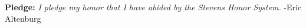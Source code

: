 \documentclass[11pt]{article}
\begin{document}
\raggedright
\newcommand\NAME{Eric Altenburg}  %
\newcommand\COURSE{MA-240}
\newcommand\HWNUM{10}              %


\begin{center}
	\textbf{Pledge:} \textit{I pledge my honor that I have abided by the Stevens Honor System.} -Eric Altenburg
\end{center}
\end{document}
